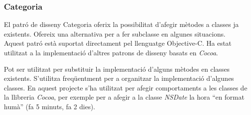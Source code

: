 
\subsubsection{Categoria}

El patró de disseny Categoria oferix la possibilitat d'afegir mètodes a classes ja existents. Ofereix una alternativa per a fer subclasse en algunes situacions. Aquest patró està suportat directament pel llenguatge Objective-C. Ha estat utilitzat a la implementació d'altres patrons de disseny basats en \textit{Cocoa}.

Pot ser utilitzat per substituir la implementació d'alguns mètodes en classes existents. S'utilitza freqüentment per a organitzar la implementació d'algunes classes. En aquest projecte s'ha utilitzat per afegir comportaments a les classes de la llibreria \textit{Cocoa}, per exemple per a afegir a la classe \textit{NSDate} la hora ``en format humà'' (fa 5 minuts, fa 2 dies).